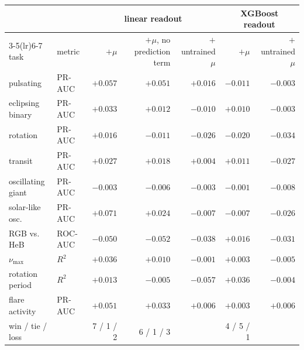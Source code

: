 \begin{tabular}{llrrrrr}
\toprule
 & & \multicolumn{3}{c}{linear readout} & \multicolumn{2}{c}{XGBoost readout} \\
\cmidrule(lr){3-5}\cmidrule(lr){6-7}
task & metric & $+\mu$ & $+\mu$, no prediction term & $+$untrained $\mu$ & $+\mu$ & $+$untrained $\mu$ \\
\midrule
pulsating & PR-AUC & $\boldsymbol{+}\mathbf{0.057}$ & $\boldsymbol{+}\mathbf{0.051}$ & ${+}0.016$ & ${-}0.011$ & ${-}0.003$ \\
eclipsing binary & PR-AUC & $\boldsymbol{+}\mathbf{0.033}$ & $\boldsymbol{+}\mathbf{0.012}$ & ${-}0.010$ & $\boldsymbol{+}\mathbf{0.010}$ & ${-}0.003$ \\
rotation & PR-AUC & ${+}0.016$ & $\boldsymbol{-}\mathbf{0.011}$ & ${-}0.026$ & $\boldsymbol{-}\mathbf{0.020}$ & ${-}0.034$ \\
transit & PR-AUC & $\boldsymbol{+}\mathbf{0.027}$ & $\boldsymbol{+}\mathbf{0.018}$ & ${+}0.004$ & ${+}0.011$ & ${-}0.027$ \\
oscillating giant & PR-AUC & $\boldsymbol{-}\mathbf{0.003}$ & $\boldsymbol{-}\mathbf{0.006}$ & ${-}0.003$ & ${-}0.001$ & ${-}0.008$ \\
solar-like osc. & PR-AUC & $\boldsymbol{+}\mathbf{0.071}$ & $\boldsymbol{+}\mathbf{0.024}$ & ${-}0.007$ & ${-}0.007$ & ${-}0.026$ \\
RGB vs. HeB & ROC-AUC & $\boldsymbol{-}\mathbf{0.050}$ & $\boldsymbol{-}\mathbf{0.052}$ & ${-}0.038$ & $\boldsymbol{+}\mathbf{0.016}$ & ${-}0.031$ \\
$\nu_{\max}$ & $R^2$ & $\boldsymbol{+}\mathbf{0.036}$ & $\boldsymbol{+}\mathbf{0.010}$ & ${-}0.001$ & $\boldsymbol{+}\mathbf{0.003}$ & ${-}0.005$ \\
rotation period & $R^2$ & $\boldsymbol{+}\mathbf{0.013}$ & ${-}0.005$ & ${-}0.057$ & $\boldsymbol{+}\mathbf{0.036}$ & ${-}0.004$ \\
flare activity & PR-AUC & $\boldsymbol{+}\mathbf{0.051}$ & $\boldsymbol{+}\mathbf{0.033}$ & ${+}0.006$ & ${+}0.003$ & ${+}0.006$ \\
\midrule
win / tie / loss & & 7 / 1 / 2 & 6 / 1 / 3 & & 4 / 5 / 1 & \\
\bottomrule
\end{tabular}
